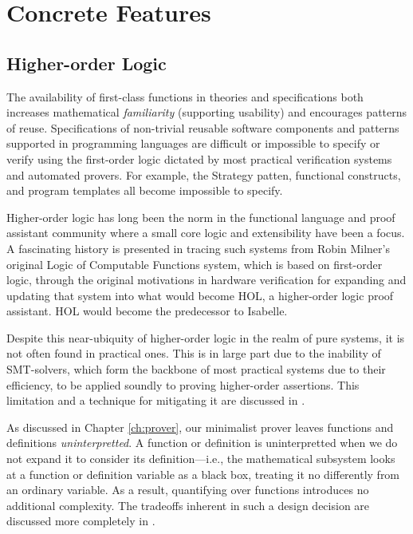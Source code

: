 \section{Concrete Features\label{mathFeatures}}

	\subsection{Higher-order Logic\label{higherOrderLogic}}

The availability of first-class functions in theories and specifications both increases mathematical \emph{familiarity} (supporting usability) and encourages patterns of reuse.  Specifications of non-trivial reusable software components and patterns supported in programming languages are difficult or impossible to specify or verify using the first-order logic dictated by most practical verification systems and automated provers.  For example, the Strategy patten, functional constructs, and program templates all become impossible to specify.

Higher-order logic has long been the norm in the functional language and proof assistant community where a small core logic and extensibility have been a focus.  A fascinating history is presented in \cite{gordon2000lcf} tracing such systems from Robin Milner's original Logic of Computable Functions system\cite{milner1972implementation}, which is based on first-order logic, through the original motivations in hardware verification for expanding and updating that system into what would become HOL\cite{gordon1993introduction}, a higher-order logic proof assistant.  HOL would become the predecessor to Isabelle\cite{nipkowIsabelle}.

Despite this near-ubiquity of higher-order logic in the realm of pure systems, it is not often found in practical ones.  This is in large part due to the inability of SMT-solvers, which form the backbone of most practical systems due to their efficiency, to be applied soundly to proving higher-order assertions.  This limitation and a technique for mitigating it are discussed in \cite{fontaine2006expressiveness}.

As discussed in Chapter \ref{ch:prover}, our minimalist prover leaves functions and definitions \emph{uninterpretted}.  A function or definition is uninterpretted when we do not expand it to consider its definition---i.e., the mathematical subsystem looks at a function or definition variable as a black box, treating it no differently from an ordinary variable.  As a result, quantifying over functions introduces no additional complexity.  The tradeoffs inherent in such a design decision are discussed more completely in \cite{tagoreExpand}.

